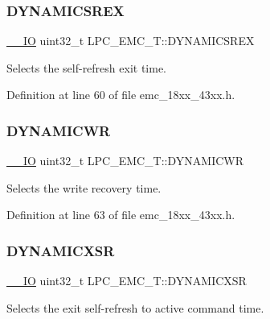 \subsubsection{\texorpdfstring{D\+Y\+N\+A\+M\+I\+C\+S\+R\+EX}{DYNAMICSREX}}
{\footnotesize\ttfamily \hyperlink{core__sc300_8h_aec43007d9998a0a0e01faede4133d6be}{\+\_\+\+\_\+\+IO} uint32\+\_\+t L\+P\+C\+\_\+\+E\+M\+C\+\_\+\+T\+::\+D\+Y\+N\+A\+M\+I\+C\+S\+R\+EX}

Selects the self-\/refresh exit time. 

Definition at line 60 of file emc\+\_\+18xx\+\_\+43xx.\+h.

\mbox{\label{struct_l_p_c___e_m_c___t_a21c84b05ffce674420ea07657bcc357a}} 
\subsubsection{\texorpdfstring{D\+Y\+N\+A\+M\+I\+C\+WR}{DYNAMICWR}}
{\footnotesize\ttfamily \hyperlink{core__sc300_8h_aec43007d9998a0a0e01faede4133d6be}{\+\_\+\+\_\+\+IO} uint32\+\_\+t L\+P\+C\+\_\+\+E\+M\+C\+\_\+\+T\+::\+D\+Y\+N\+A\+M\+I\+C\+WR}

Selects the write recovery time. 

Definition at line 63 of file emc\+\_\+18xx\+\_\+43xx.\+h.

\mbox{\label{struct_l_p_c___e_m_c___t_acfff1a925ac3ab5d421801a368741e05}} 
\subsubsection{\texorpdfstring{D\+Y\+N\+A\+M\+I\+C\+X\+SR}{DYNAMICXSR}}
{\footnotesize\ttfamily \hyperlink{core__sc300_8h_aec43007d9998a0a0e01faede4133d6be}{\+\_\+\+\_\+\+IO} uint32\+\_\+t L\+P\+C\+\_\+\+E\+M\+C\+\_\+\+T\+::\+D\+Y\+N\+A\+M\+I\+C\+X\+SR}

Selects the exit self-\/refresh to active command time. 

